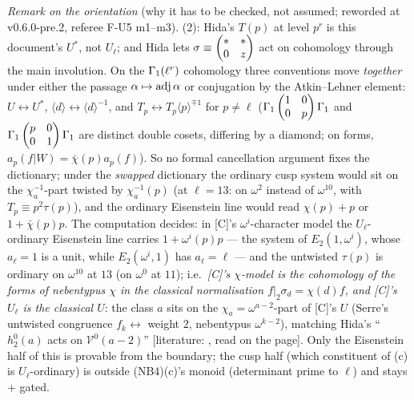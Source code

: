 \documentclass[11pt]{article}
\newcommand{\LIT}[1]{\textsf{[literature: #1]}}   %
\begin{document}
\noindent\emph{Remark on the orientation} (why it has to be checked, not assumed; reworded at v0.6.0-pre.2, referee F-U5 m1--m3). (2): Hida's $T(p)$ at level $p^{r}$ is
this document's $U^{\ast}$, not $U_\ell$; and Hida lets $\sigma\equiv\begin{pmatrix} \ast & \ast \\ 0 & z \end{pmatrix}$ act on cohomology through the main involution. On the $\Gamma_1(\ell^{r})$ cohomology three conventions move
\emph{together} under either the passage $\alpha\mapsto\operatorname{adj}\alpha$ or conjugation by the Atkin--Lehner element: $U\leftrightarrow U^{\ast}$, $\langle d\rangle\leftrightarrow\langle d\rangle^{-1}$,
and $T_p\leftrightarrow T_p\langle p\rangle^{\mp1}$ for $p\ne\ell$ ($\Gamma_1\begin{pmatrix} 1 & 0 \\ 0 & p \end{pmatrix}\Gamma_1$ and $\Gamma_1\begin{pmatrix} p & 0 \\ 0 & 1 \end{pmatrix}\Gamma_1$ are distinct double cosets, differing by a diamond; on forms, $a_p(f|W)=\bar\chi(p)a_p(f)$).
So no formal cancellation argument fixes the dictionary; under the \emph{swapped} dictionary the ordinary cusp system would sit on the $\chi_a^{-1}$-part twisted by $\chi_a^{-1}(p)$ (at $\ell=13$: on $\omega^{2}$
instead of $\omega^{10}$, with $T_p\equiv p^{2}\tau(p)$), and the ordinary Eisenstein line would read $\chi(p)+p$ or $1+\bar\chi(p)p$. The computation decides: in [C]'s $\omega^{i}$-character model the
$U_\ell$-ordinary Eisenstein line carries $1+\omega^{i}(p)p$ --- the system of $E_2(1,\omega^{i})$, whose $a_\ell=1$ is a unit, while $E_2(\omega^{i},1)$ has $a_\ell=\ell$ --- and the untwisted $\tau(p)$ is
ordinary on $\omega^{10}$ at $13$ (on $\omega^{0}$ at $11$); i.e.\ \emph{[C]'s $\chi$-model is the cohomology of the forms of nebentypus $\chi$ in the classical normalisation $f|_2\sigma_d=\chi(d)f$, and
[C]'s $U_\ell$ is the classical $U$}: the class $a$ sits on the $\chi_a=\omega^{a-2}$-part of [C]'s $U$ (Serre's untwisted congruence $f_k\leftrightarrow$ weight $2$, nebentypus $\omega^{k-2}$),
matching Hida's ``$h^{0}_2(a)$ acts on $\mathcal V^{0}(a-2)$'' \LIT{\cite[p.~593]{hida_invent}, read on the page}. Only the Eisenstein half of this is provable from the boundary; the cusp half
(which constituent of (c) is $U_\ell$-ordinary) is outside (NB4)(c)'s monoid (determinant prime to $\ell$) and stays \COMP{} + gated.
\end{document}
